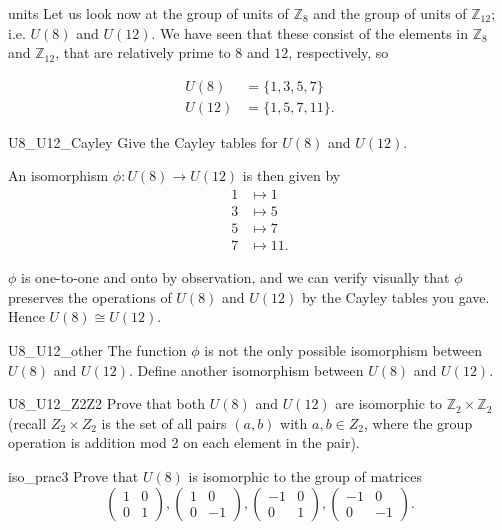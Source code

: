 \begin{example}{units}
Let us look now at  the group of units of ${\mathbb Z}_8$ and the group of units of ${\mathbb Z}_{12}$; i.e. $U(8)$ and $U(12)$.  We have seen that these  consist of the elements in ${\mathbb Z}_8$ and ${\mathbb Z}_{12}$, that are relatively prime to $8$ and $12$, respectively, so

\begin{align*}
U(8) & = \{1, 3, 5, 7 \} \\
U(12) & = \{1, 5, 7, 11 \}.
\end{align*}

\begin{exercise}{U8_U12_Cayley}
Give the Cayley tables for $U(8)$ and $U(12)$.
\end{exercise}

An isomorphism $\phi : U(8) \rightarrow U(12)$ is then given by
\begin{align*}
1 & \mapsto  1 \\
3 & \mapsto  5 \\
5 & \mapsto  7 \\
7 & \mapsto  11.
\end{align*}

$\phi$ is one-to-one and onto by observation, and we can verify visually that $\phi$ preserves the operations of $U(8)$ and $U(12)$ by the Cayley tables you gave.  Hence $U(8) \cong U(12)$.
\end{example}

\begin{exercise}{U8_U12_other}
The function $\phi$ is not the only possible isomorphism between $U(8)$ and $U(12)$.  Define another isomorphism between $U(8)$ and $U(12)$.
\end{exercise}

\begin{exercise}{U8_U12_Z2Z2}
Prove that both $U(8)$ and $U(12)$ are isomorphic to ${\mathbb Z}_2 \times {\mathbb Z}_2$ (recall $Z_2 \times Z_2$ is the set of all pairs $(a,b)$ with $a,b \in Z_2$, where 
the group operation is addition mod 2 on each element in the pair). 
\end{exercise}

 \begin{exercise}{iso_prac3}
Prove that $U(8)$ is isomorphic to the group of matrices
\[
\begin{pmatrix}
1 & 0 \\
0 & 1
\end{pmatrix},
\begin{pmatrix}
1 & 0 \\
0 & -1
\end{pmatrix},
\begin{pmatrix}
-1 & 0 \\
0 & 1
\end{pmatrix},
\begin{pmatrix}
-1 & 0 \\
0 & -1
\end{pmatrix}.
\]
\end{exercise} 

